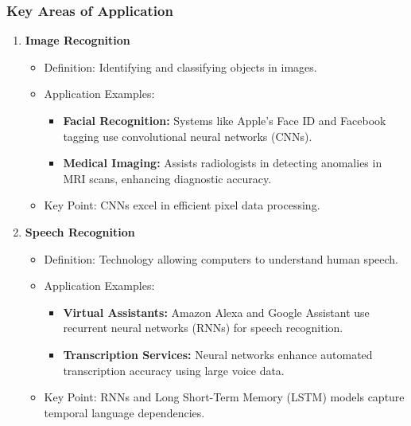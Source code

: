 \documentclass[aspectratio=169]{beamer}
\begin{document}
\begin{frame}[fragile]
    \frametitle{Key Areas of Application}
    \begin{enumerate}
        \item \textbf{Image Recognition}
            \begin{itemize}
                \item Definition: Identifying and classifying objects in images.
                \item Application Examples:
                    \begin{itemize}
                        \item \textbf{Facial Recognition:} Systems like Apple’s Face ID and Facebook tagging use convolutional neural networks (CNNs).
                        \item \textbf{Medical Imaging:} Assists radiologists in detecting anomalies in MRI scans, enhancing diagnostic accuracy.
                    \end{itemize}
                \item Key Point: CNNs excel in efficient pixel data processing.
            \end{itemize}

        \item \textbf{Speech Recognition}
            \begin{itemize}
                \item Definition: Technology allowing computers to understand human speech.
                \item Application Examples:
                    \begin{itemize}
                        \item \textbf{Virtual Assistants:} Amazon Alexa and Google Assistant use recurrent neural networks (RNNs) for speech recognition.
                        \item \textbf{Transcription Services:} Neural networks enhance automated transcription accuracy using large voice data.
                    \end{itemize}
                \item Key Point: RNNs and Long Short-Term Memory (LSTM) models capture temporal language dependencies.
            \end{itemize}
    \end{enumerate}
\end{frame}
\end{document}
